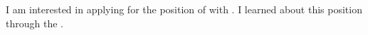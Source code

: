I am interested in applying for the  position of  with .
I learned about this position through the .